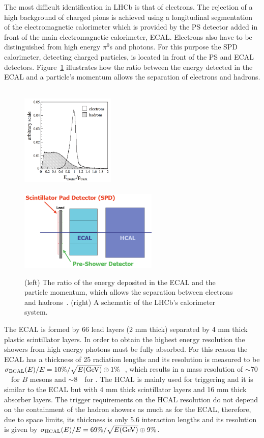 The most difficult identification in LHCb is that of electrons. The rejection of a high background of charged pions
is achieved using a longitudinal segmentation of the electromagnetic calorimeter which is provided by
the PS detector added in front of the main electromagnetic calorimeter, ECAL. Electrons also have to be 
distinguished from high energy $\pi^0$s and photons. For this purpose the SPD calorimeter, detecting charged particles,
is located in front of the PS and ECAL detectors. Figure~\ref{fig:pi0_e_pid_perf} illustrates how the ratio between the
energy detected in the ECAL and a particle's momentum allows the separation of electrons and hadrons.

\begin{figure}[t!]
\centering
\includegraphics[width=0.4\textwidth,height=5.3cm]{Detector/figs/pi0_e_pid_perf.png}
\includegraphics[width=0.59\textwidth]{Detector/figs/calo_layout.png}
\caption{(left) The ratio of the energy deposited in the ECAL and the particle momentum, which allows
the separation between electrons and hadrons~\cite{Alves:2008zz}. (right) A schematic of the LHCb's calorimeter system. }
\label{fig:pi0_e_pid_perf}
\end{figure}

The ECAL is formed by 66 lead layers (2 mm thick) separated by 4 mm thick plastic scintillator layers.
In order to obtain the highest energy resolution the showers from high energy photons 
must be fully absorbed. For this reason the ECAL has a thickness of 25 radiation lengths and its resolution is 
measured to be $\sigma_{\rm ECAL}(E) / E = 10\% / \sqrt{E({\rm GeV})} \oplus 1\%$~\cite{Alves:2008zz},
which results in a mass resolution of $\sim 70$~\mevcc~for $B$ mesons and $\sim 8$~\mevcc~for \piz.
The HCAL is mainly used for triggering and it is similar to the ECAL but with 4 mm thick scintillator layers and 
16 mm thick absorber layers. The trigger requirements on the HCAL resolution do not depend on the containment of the hadron showers
as much as for the ECAL, therefore, due to space limits, its thickness is only 5.6 interaction lengths and its resolution is given by
 $\sigma_{\rm HCAL}(E) / E = 69\%/\sqrt{E({\rm GeV})} \oplus 9\%$.

